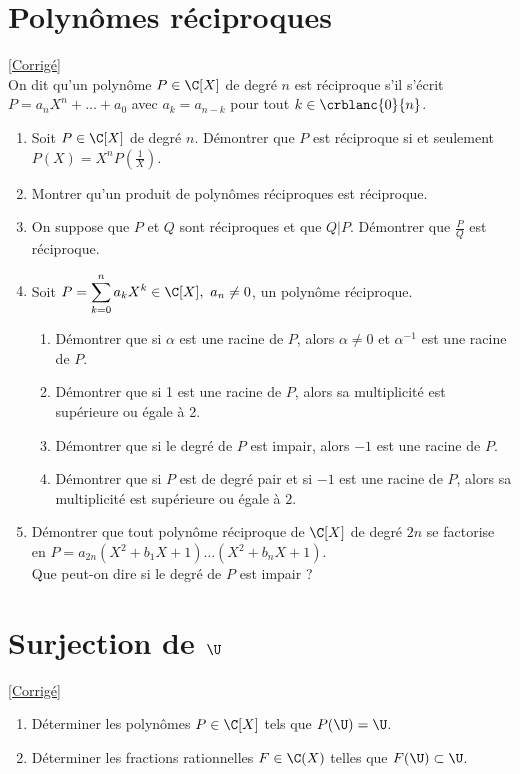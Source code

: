 \documentclass{book}
\begin{document}
	\section{Polynômes réciproques }
	\textcolor{blue}{\hyperref[sec:polynomes-reciproques-etoile2]{[Corrigé]}}\\
	\label{Polynômes réciproques}
	On dit qu'un polynôme $P\in\C[X]$ de degré $n$ est réciproque s'il s'écrit $P=a_nX^n+\dots+a_0$ avec $a_k=a_{n-k}$ pour tout $k\in\crblanc{0}{n}$.
	\begin{enumerate}
		\item Soit $P\in\C[X]$ de degré $n$. Démontrer que $P$ est réciproque si et seulement $P(X)=X^nP\left(\displaystyle\frac{1}{X}\right)$.
		\item Montrer qu'un produit de polynômes réciproques est réciproque.
		\item On suppose que $P$ et $Q$ sont réciproques et que $Q|P$. Démontrer que $\displaystyle\frac{P}{Q}$ est réciproque.
		\item Soit $P=\displaystyle\sum\limits_{k=0}^n{a_kX^k}\in\C[X],\ a_n\ne 0$, un polynôme réciproque.
		\begin{enumerate}[label=\alph*.]
			\item Démontrer que si $\alpha$ est une racine de $P$, alors $\alpha\ne0$ et $\alpha^{-1}$ est une racine de $P$.
			\item Démontrer que si 1 est une racine de $P$, alors sa multiplicité est supérieure ou égale à 2.
			\item Démontrer que si le degré de $P$ est impair, alors $-1$ est une racine de $P$.
			\item Démontrer que si $P$ est de degré pair et si $-1$ est une racine de $P$, alors sa multiplicité est supérieure ou égale à $2$.
		\end{enumerate}
		\item Démontrer que tout polynôme réciproque de $\C[X]$ de degré $2n$ se factorise en $P=a_{2n}(X^2+b_1X+1)\dots(X^2+b_nX+1)$.
		\\Que peut-on dire si le degré de $P$ est impair ?
	\end{enumerate}
	
	\section{Surjection de $\U$ }
	\textcolor{blue}{\hyperref[Surjection de U corrigé]{[Corrigé]}}\\
	\label{Surjection de U}
	\begin{enumerate}[leftmargin=*]
		\item Déterminer les polynômes $P\in \C[X]$ tels que $P(\U)=\U$.
		\item Déterminer les fractions rationnelles $F\in \C(X)$ telles que $F(\U)\subset \U$.
	\end{enumerate}
	
\end{document}
